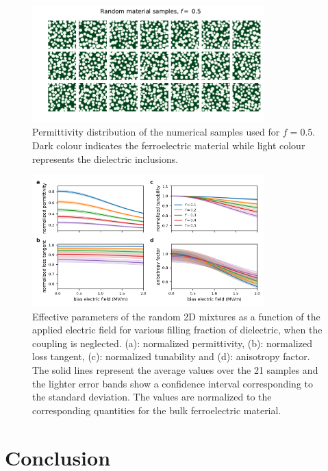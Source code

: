 \documentclass[%
 aip,
 amsmath,amssymb,
 reprint,%
linenumbers
]{revtex4-1}
\newcommand{\co}[1]{\textcolor{correction}{#1}}
\begin{document}
%
\begin{figure}[h!]
 \centering
 \includegraphics[width=0.8\textwidth]{random_samples_f_50percent}
 \caption{Permittivity distribution of the numerical samples used for $f=0.5$. Dark
  colour indicates the ferroelectric material while light colour represents the
  dielectric inclusions.}
 \label{randmatepsi}
\end{figure}


\begin{figure}[h!]
 \centering
 \includegraphics[width=0.8\textwidth]{effpar_rand_uncpl.png}
 \caption{Effective parameters of the random 2D mixtures as a function of the
  applied electric field for various filling fraction of dielectric, when the
  coupling is neglected.
  (a): normalized permittivity, (b): normalized loss tangent, (c): normalized tunability and
  (d): anisotropy factor. The solid lines represent the average values
  over the 21 samples and the lighter error bands show a confidence interval corresponding to
  the standard deviation. \co{The values are normalized to the corresponding quantities for the bulk ferroelectric material.}}
 \label{eff_par_2Drand_TM_uncpl}
\end{figure}
%
\section{Conclusion}
\end{document}
